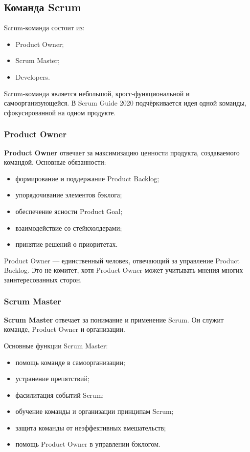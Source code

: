 \documentclass[12pt,a4paper]{article}
\begin{document}
\subsection{Команда Scrum}

Scrum-команда состоит из:
\begin{itemize}
    \item Product Owner;
    \item Scrum Master;
    \item Developers.
\end{itemize}

Scrum-команда является небольшой, кросс-функциональной и самоорганизующейся. В Scrum Guide 2020 подчёркивается идея одной команды, сфокусированной на одном продукте.

\subsubsection{Product Owner}

\textbf{Product Owner} отвечает за максимизацию ценности продукта, создаваемого командой. Основные обязанности:

\begin{itemize}
    \item формирование и поддержание Product Backlog;
    \item упорядочивание элементов бэклога;
    \item обеспечение ясности Product Goal;
    \item взаимодействие со стейкхолдерами;
    \item принятие решений о приоритетах.
\end{itemize}

Product Owner --- единственный человек, отвечающий за управление Product Backlog. Это не комитет, хотя Product Owner может учитывать мнения многих заинтересованных сторон.

\subsubsection{Scrum Master}

\textbf{Scrum Master} отвечает за понимание и применение Scrum. Он служит команде, Product Owner и организации.

Основные функции Scrum Master:
\begin{itemize}
    \item помощь команде в самоорганизации;
    \item устранение препятствий;
    \item фасилитация событий Scrum;
    \item обучение команды и организации принципам Scrum;
    \item защита команды от неэффективных вмешательств;
    \item помощь Product Owner в управлении бэклогом.
\end{itemize}
\end{document}
